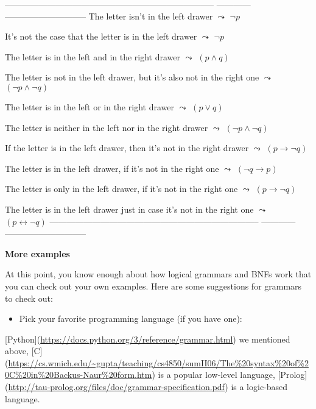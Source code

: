 \documentclass[11pt]{article}
\begin{document}
-------------------------------------------------------------------------- ------------ -----------------------------
The letter isn't in the left drawer                                         \(\leadsto\)            \(\neg p\)

It's not the case that the letter is in the left drawer                     \(\leadsto\)            \(\neg p\)

The letter is in the left and in the right drawer                           \(\leadsto\)            \((p\land q)\)

The letter is not in the left drawer, but it's also not in the right one    \(\leadsto\)     \((\neg p\land \neg q)\)

The letter is in the left or in the right drawer                            \(\leadsto\)           \((p\lor q)\)

The letter is neither in the left nor in the right drawer                   \(\leadsto\)     \((\neg p\land \neg q)\)

If the letter is in the left drawer, then it's not in the right drawer      \(\leadsto\)         \((p\rightarrow \neg q)\)

The letter is in the left drawer, if it's not in the right one              \(\leadsto\)         \((\neg q\rightarrow p)\)

The letter is only in the left drawer, if it's not in the right one         \(\leadsto\)         \((p\rightarrow \neg q)\)

The letter is in the left drawer just in case it's not in the right one     \(\leadsto\)   \((p\leftrightarrow \neg q)\)
-------------------------------------------------------------------------- ------------ -----------------------------

\textbf{\textbf{More examples}}

At this point, you know enough about how logical grammars and BNFs work that you
can check out your own examples. Here are some suggestions for grammars to check
out:


\begin{itemize}
\item Pick your favorite programming language (if you have one):
\end{itemize}
[Python](\url{https://docs.python.org/3/reference/grammar.html}) we mentioned above,
[C](\url{https://cs.wmich.edu/\~gupta/teaching/cs4850/sumII06/The\%20syntax\%20of\%20C\%20in\%20Backus-Naur\%20form.htm})
is a popular low-level language,
[Prolog](\url{http://tau-prolog.org/files/doc/grammar-specification.pdf}) is a
logic-based language. 
\end{document}
